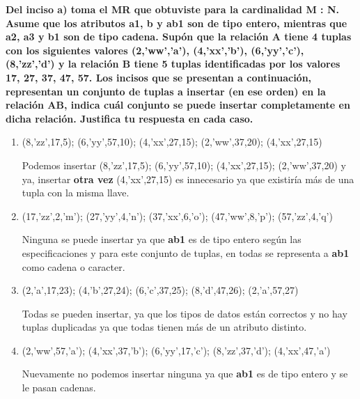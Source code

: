 \textbf{Del inciso a) toma el MR que obtuviste para la cardinalidad M : N. Asume que los atributos a1, b y ab1 son de tipo
entero, mientras que a2, a3 y b1 son de tipo cadena. Supón que la relación A tiene 4 tuplas con los siguientes valores
(2,’ww’,’a’), (4,’xx’,’b’), (6,’yy’,’c’), (8,’zz’,’d’) y la relación B tiene 5 tuplas identificadas por
los valores 17, 27, 37, 47, 57. Los incisos que se presentan a continuación, representan un conjunto de tuplas
a insertar (en ese orden) en la relación AB, indica cuál conjunto se puede insertar completamente en dicha relación.
Justifica tu respuesta en cada caso.}\vspace{.3cm}

\begin{enumerate}
    \item (8,’zz’,17,5); (6,’yy’,57,10); (4,’xx’,27,15); (2,’ww’,37,20); (4,’xx’,27,15)
    
    Podemos insertar (8,’zz’,17,5); (6,’yy’,57,10); (4,’xx’,27,15); (2,’ww’,37,20) y ya, insertar \textbf{otra vez} (4,’xx’,27,15) es innecesario ya que existiría más de una tupla con la misma llave.

    \item (17,’zz’,2,’m’); (27,’yy’,4,’n’); (37,’xx’,6,’o’); (47,’ww’,8,’p’); (57,’zz’,4,’q’)
    
    Ninguna se puede insertar ya que \textbf{ab1} es de tipo entero según las especificaciones y para este conjunto de tuplas, en todas se representa a \textbf{ab1} como cadena o caracter. 

    \item (2,’a’,17,23); (4,’b’,27,24); (6,’c’,37,25); (8,’d’,47,26); (2,’a’,57,27)
    
    Todas se pueden insertar, ya que los tipos de datos están correctos y no hay tuplas duplicadas ya que todas tienen más de un atributo distinto. 

    \item (2,’ww’,57,’a’); (4,’xx’,37,’b’); (6,’yy’,17,’c’); (8,’zz’,37,’d’); (4,’xx’,47,’a’)
    
    Nuevamente no podemos insertar ninguna ya que \textbf{ab1} es de tipo entero y se le pasan cadenas. 
\end{enumerate}

\vspace{.5cm}
